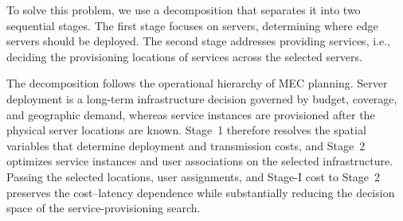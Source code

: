 \documentclass[10pt, conference, letterpaper]{IEEEtran}
\begin{document}
To solve this problem, we use a decomposition that separates it into two sequential stages. The first stage focuses on servers, determining where edge servers should be deployed. The second stage addresses providing services, i.e., deciding the provisioning locations of services across the selected servers. 


The decomposition follows the operational hierarchy of MEC planning. Server deployment is a long-term infrastructure decision governed by budget, coverage, and geographic demand, whereas service instances are provisioned after the physical server locations are known. Stage~1 therefore resolves the spatial variables that determine deployment and transmission costs, and Stage~2 optimizes service instances and user associations on the selected infrastructure. Passing the selected locations, user assignments, and Stage-I cost to Stage~2 preserves the cost--latency dependence while substantially reducing the decision space of the service-provisioning search.
\end{document}
